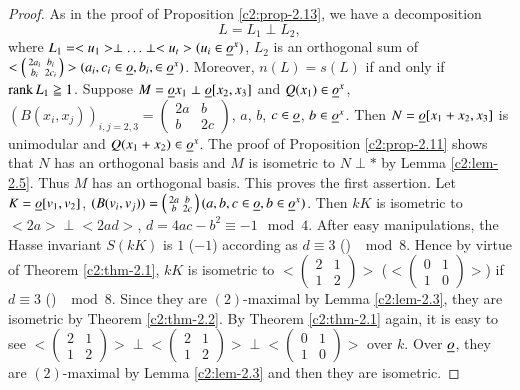 \begin{proof}
As in the proof of Proposition \ref{c2:prop-2.13}, we have a
decomposition
$$
L=L_{1}\perp L_{2},
$$
where $L_{1}=<u_{1}>\perp\ldots\perp<u_{t}>(u_{i}\in\underline{o}^{x})$,
$L_{2}$ is an orthogonal sum of $<\left(\begin{smallmatrix} 2a_{i} &
  b_{i}\\ b_{i} &
  2c_{i}\end{smallmatrix}\right)>(a_{i},c_{i}\in\underline{o},b_{i},\in\underline{o}^{x})$. Moreover,
$n(L)=s(L)$ if and only if $\operatorname{rank} L_{1}\geqq 1$. Suppose
$M=\underline{o}x_{1}\perp \underline{o}[x_{2},x_{3}]$ and
$Q(x_{1})\in\underline{o}^{x}$,
$(B(x_{i},x_{j}))_{i,j=2,3}=\left(\begin{smallmatrix} 2a & b\\ b & 2c
\end{smallmatrix}\right)$, $a$, $b$, $c\in\underline{o}$,
$b\in\underline{o}^{x}$. Then $N=\underline{o}[x_{1}+x_{2},x_{3}]$ is unimodular
and $Q(x_{1}+x_{2})\in\underline{o}^{x}$. The proof of Proposition
\ref{c2:prop-2.11}  shows that $N$ has an orthogonal basis and $M$ is
isometric to $N\perp\ast$ by Lemma \ref{c2:lem-2.5}. Thus $M$ has an
orthogonal basis. This proves the first assertion. Let
$K=\underline{o}[v_{1},v_{2}]$, $(B(v_{i},v_{j}))=\left(\begin{smallmatrix}
  2a & b\\ b & 2c\end{smallmatrix}\right)(a,b,c\in\underline{o},b\in
  \underline{o}^{x})$. Then $kK$ is isometric to $<2a>\perp <2ad>$,
  $d=4ac-b^{2}\equiv -1\mod 4$. After easy manipulations, the Hasse
  invariant $S(kK)$ is $1$ (\resp $-1$) according as $d\equiv 3$
  () $\mod 8$. Hence by virtue of Theorem \ref{c2:thm-2.1}, $kK$
  is isometric to $<\left(\begin{smallmatrix} 2 & 1\\ 1 & 2
  \end{smallmatrix}\right)>$ (\resp $<\left(\begin{smallmatrix} 0 &
    1\\ 1 & 0  \end{smallmatrix}\right)>$) if $d\equiv 3$ ()
  $\mod 8$. Since they are $(2)$-maximal by Lemma \ref{c2:lem-2.3}, they
  are isometric by Theorem \ref{c2:thm-2.2}. By Theorem \ref{c2:thm-2.1}
  again, it is easy to see $<\left(\begin{smallmatrix} 2 & 1\\ 1 & 2
  \end{smallmatrix}\right)>\perp<\left(\begin{smallmatrix} 2 & 1\\ 1 &
    2
  \end{smallmatrix}\right)>\perp<\left(\begin{smallmatrix} 0 & 1\\ 1 &
    0
  \end{smallmatrix}\right)>$ over $k$. Over $\underline{o}$, they are
  $(2)$-maximal by Lemma \ref{c2:lem-2.3} and then they are isometric.
\end{proof}

